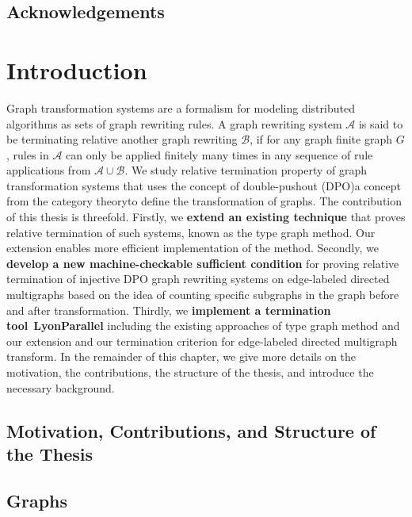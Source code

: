 \documentclass{report}
\begin{document}
  
  
  
 
\section*{Acknowledgements}

\newpage       

 
\tableofcontents  
\newpage      
  
\chapter{Introduction}
Graph transformation systems are a formalism for modeling distributed algorithms as sets of graph rewriting rules. A graph rewriting system 
\( \mathcal{A} \) is said to be terminating relative another graph rewriting \( \mathcal{B} \), if for any graph finite graph $G$,
rules in $\mathcal{A}$ can only be applied finitely many times in any sequence of rule applications from $\mathcal{A} \cup \mathcal{B}$. 
We study relative termination property of graph transformation systems that uses the concept of double-pushout (DPO)\textemdash a concept from the category theory\textemdash to define the transformation of graphs.
 The contribution of this thesis is threefold. 
 Firstly, we \textbf{extend an existing technique} that proves relative termination of such systems, known as the type graph method. Our extension enables more efficient implementation of the method. Secondly, we \textbf{develop a new machine-checkable sufficient condition} for proving relative termination of injective DPO graph rewriting systems on edge-labeled directed multigraphs based on the idea of counting specific subgraphs in the graph before and after transformation. Thirdly, we \textbf{implement a termination tool}~\textbf{LyonParallel} including the existing approaches of type graph method and our extension and our termination criterion for edge-labeled directed multigraph transform. In the remainder of this chapter, we give more details on the motivation, the contributions, the structure of the thesis, and introduce the necessary background.
\section{Motivation, Contributions, and Structure of the Thesis} 

\section{Graphs}
 
\end{document}
